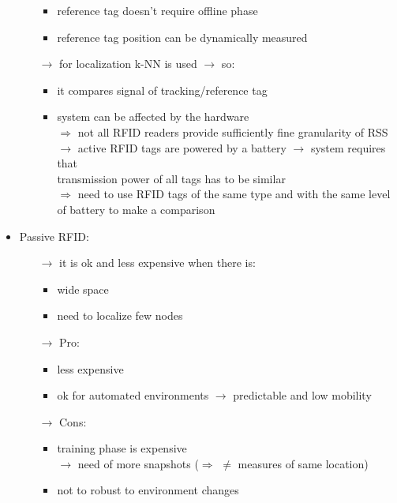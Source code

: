 \begin{itemize}
\begin{itemize}
\begin{itemize}
            \item reference tag doesn't require offline phase
            \item reference tag position can be dynamically measured
        \end{itemize} 
        \item[$\rightarrow$] for localization k-NN is used $\rightarrow$ so:
        \begin{itemize}
            \item it compares signal of tracking/reference tag
            \item system can be affected by the hardware\\[0.15cm]
            $\Rightarrow$ not all RFID readers provide sufficiently fine granularity of RSS\\[0.15cm]
            $\rightarrow$ active RFID tags are powered by a battery
            $\rightarrow$ system requires that\\transmission power of all tags has to be similar\\[0.15cm]
            $\Rightarrow$ need to use RFID tags of the same type and with the same level of battery to make a comparison
        \end{itemize}
    \end{itemize}
    \item Passive RFID:
    \begin{itemize}
        \item[$\rightarrow$] it is ok and less expensive when there is:
        \begin{itemize}
            \item wide space
            \item need to localize few nodes
        \end{itemize}
        \item[$\rightarrow$] Pro:
        \begin{itemize}
            \item less expensive
            \item ok for automated environments $\rightarrow$ predictable and low mobility
        \end{itemize}
        \item[$\rightarrow$] Cons:
        \begin{itemize}
            \item training phase is expensive\\$\rightarrow$ need of more snapshots ($\Rightarrow$ $\neq$ measures of same location)
            \item not to robust to environment changes
        \end{itemize}
    \end{itemize}
\end{itemize}

